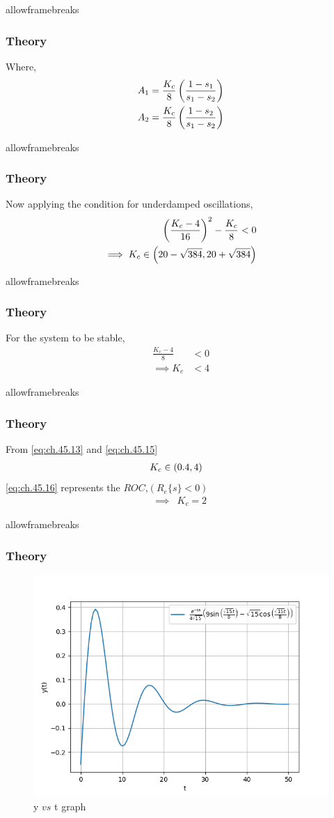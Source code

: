 \documentclass{beamer}
\begin{document}
\begin{frame}{allowframebreaks}
\frametitle{Theory}
Where,
\begin{align}
    A_1 &= \frac{K_c}{8} \left(\frac{1-s_1}{s_1-s_2}\right)    \\
    A_2 &= \frac{K_c}{8} \left(\frac{1-s_2}{s_1-s_2}\right)    
\end{align}
\end{frame}

\begin{frame}{allowframebreaks}
\frametitle{Theory}
Now applying the condition for underdamped oscillations,
\begin{align}
    \left(\frac{K_c-4}{16}\right)^2 - \frac{K_c}{8} < 0    \\
    \implies K_c \in \left(20-\sqrt{384} , 20+\sqrt{384}\right)   \label{eq:ch.45.13}
\end{align}
\end{frame}

\begin{frame}{allowframebreaks}
\frametitle{Theory}
For the system to be stable,
\begin{align}
    \frac{K_c-4}{8}&<0   \\
    \implies K_c&<4 	\label{eq:ch.45.15}
\end{align}
\end{frame}

\begin{frame}{allowframebreaks}
\frametitle{Theory}
From \eqref{eq:ch.45.13} and \eqref{eq:ch.45.15}
\begin{align}
    &K_c \in \left(0.4,4\right)    \label{eq:ch.45.16}
\end{align}
\eqref{eq:ch.45.16} represents the $ROC$,$(R_e\{s\}<0)$
\begin{align}
    \implies &K_c=2
\end{align}
\end{frame}

\begin{frame}{allowframebreaks}
\frametitle{Theory}
\begin{figure}[htbp]
    \centering
    \includegraphics[width=\columnwidth]{figs/b.png}
    \caption{y $vs$ t graph}
    \label{fig:ch.45.2}
\end{figure} 
\end{frame}
\end{document}
